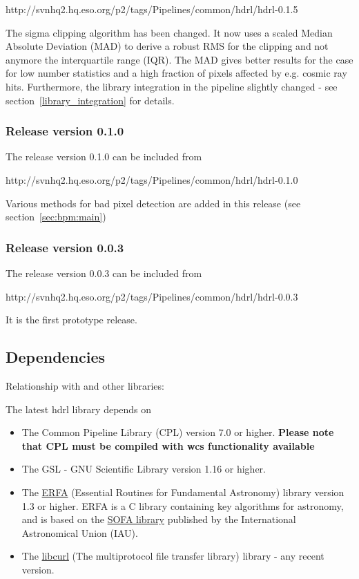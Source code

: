 http://svnhq2.hq.eso.org/p2/tags/Pipelines/common/hdrl/hdrl-0.1.5

The sigma clipping algorithm has been changed. It now uses a scaled
Median Absolute Deviation (MAD) to derive a robust RMS for the
clipping and not anymore the interquartile range (IQR). The MAD gives
better results for the case for low number statistics and a high
fraction of pixels affected by e.g. cosmic ray hits.  Furthermore, the
library integration in the pipeline slightly changed - see
section~\ref{library_integration} for details.

\subsubsection{Release version 0.1.0}
The \HDRL release version 0.1.0 can be included from

http://svnhq2.hq.eso.org/p2/tags/Pipelines/common/hdrl/hdrl-0.1.0

Various methods for bad pixel detection are added in this release (see
section~\ref{sec:bpm:main})

\subsubsection{Release version 0.0.3}
The \HDRL release version 0.0.3 can be included from

http://svnhq2.hq.eso.org/p2/tags/Pipelines/common/hdrl/hdrl-0.0.3

It is the first prototype release.

\subsection{Dependencies}
\label{library_dependencies}

Relationship with \CPL and other libraries:

The latest hdrl library depends on

\begin{itemize}
\item The Common Pipeline Library (CPL) version 7.0 or
  higher. \textbf{Please note that CPL must be compiled with wcs
    functionality available}
\item The GSL - GNU Scientific Library version 1.16 or higher.
\item The \href{https://github.com/liberfa/erfa}{ERFA} (Essential
  Routines for Fundamental Astronomy) library version 1.3 or
  higher. ERFA is a C library containing key algorithms for
  astronomy, and is based on the \href{http://www.iausofa.org}{SOFA
    library} published by the International Astronomical Union (IAU).
\item The \href{https://curl.se/libcurl/}{libcurl} (The multiprotocol
  file transfer library) library - any recent version.
\end{itemize}

